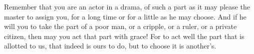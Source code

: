 Remember that you are an actor in a drama,  of such a part as it may please the
master to assign you, for a long time or  for a little as he may choose. And if
he will  you to take the  part of a  poor man, or a  cripple, or a ruler,  or a
private citizen,  then may you act  that part with  grace! For to act  well the
part that  is allotted to us,  that indeed is ours  to do, but to  choose it is
another's.
